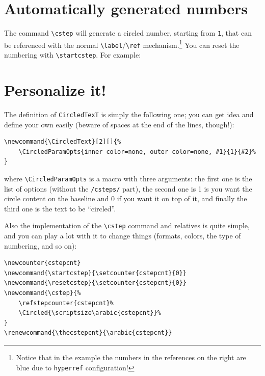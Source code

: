 \documentclass{ltxdoc}
\begin{document}
\section{Automatically generated numbers}

The command \verb|\cstep| will generate a circled number, starting from \texttt{1}, that can be referenced with the normal \verb|\label|/\verb|\ref| mechanism.\footnote{Notice that in the example the numbers in the references on the right are blue due to \texttt{hyperref} configuration!} You can reset the numbering with
\verb|\startcstep|. For example:






\bigskip

\section{Personalize it!}

The definition of \verb|CircledTexT| is simply the following one; you can get idea and define your own easily (beware of spaces at the end of the lines, though!):

\begin{lstlisting}
\newcommand{\CircledText}[2][]{%
    \CircledParamOpts{inner color=none, outer color=none, #1}{1}{#2}%
}
\end{lstlisting}

where \verb|\CircledParamOpts| is a macro with three arguments: the first one is the list of options (without the \texttt{/csteps/} part), the second one is 1 is you want the circle content on the baseline and 0 if you want it on top of it, and finally the third one is the text to be ``circled''.

Also the implementation of the \verb|\cstep| command and relatives is quite simple, and you can play a lot with it to change things (formats, colors, the type of numbering, and so on):

\begin{lstlisting}
\newcounter{cstepcnt}
\newcommand{\startcstep}{\setcounter{cstepcnt}{0}}
\newcommand{\resetcstep}{\setcounter{cstepcnt}{0}}
\newcommand{\cstep}{%
    \refstepcounter{cstepcnt}%
    \Circled{\scriptsize\arabic{cstepcnt}}%
}
\renewcommand{\thecstepcnt}{\arabic{cstepcnt}}
\end{lstlisting}
\end{document}
